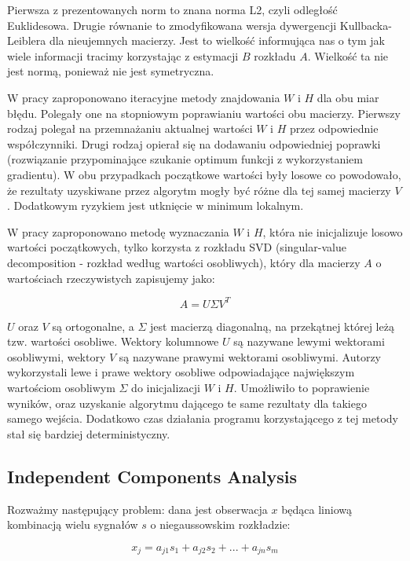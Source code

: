 \documentclass[oneside, eng]{mgr}
\begin{document}
Pierwsza z prezentowanych norm to znana norma L2, czyli odległość Euklidesowa. Drugie równanie to zmodyfikowana wersja dywergencji Kullbacka-Leiblera dla nieujemnych macierzy. Jest to wielkość informująca nas o tym jak wiele informacji tracimy korzystając z estymacji $B$ rozkładu $A$. Wielkość ta nie jest normą, ponieważ nie jest symetryczna.

W pracy \cite{NMF} zaproponowano iteracyjne metody znajdowania $W$ i $H$ dla obu miar błędu. Polegały one na stopniowym poprawianiu wartości obu macierzy. Pierwszy rodzaj polegał na przemnażaniu aktualnej wartości $W$ i $H$ przez odpowiednie współczynniki. Drugi rodzaj opierał się na dodawaniu odpowiedniej poprawki (rozwiązanie przypominające szukanie optimum funkcji z wykorzystaniem gradientu). W obu przypadkach początkowe wartości były losowe co powodowało, że rezultaty uzyskiwane przez algorytm mogły być różne dla tej samej macierzy $V$. Dodatkowym ryzykiem jest utknięcie w minimum lokalnym.

W pracy \cite{NMF_SVD} zaproponowano metodę wyznaczania $W$ i $H$, która nie inicjalizuje losowo wartości początkowych, tylko korzysta z rozkładu SVD (singular-value decomposition - rozkład według wartości osobliwych), który dla macierzy $A$ o wartościach rzeczywistych zapisujemy jako:

\begin{equation}
	A = U \Sigma V^T
\end{equation}

$U$ oraz $V$ są ortogonalne, a $\Sigma$ jest macierzą diagonalną, na przekątnej której leżą tzw. wartości osobliwe. Wektory kolumnowe $U$ są nazywane lewymi wektorami osobliwymi, wektory $V$ są nazywane prawymi wektorami osobliwymi. Autorzy \cite{NMF_SVD} wykorzystali lewe i prawe wektory osobliwe odpowiadające największym wartościom osobliwym $\Sigma$ do inicjalizacji $W$ i $H$. Umożliwiło to poprawienie wyników, oraz uzyskanie algorytmu dającego te same rezultaty dla takiego samego wejścia. Dodatkowo czas działania programu korzystającego z tej metody stał się bardziej deterministyczny.

\subsection{Independent Components Analysis}

Rozważmy następujący problem: dana jest obserwacja $x$ będąca liniową kombinacją wielu sygnałów $s$ o niegaussowskim rozkładzie:

\begin{equation}
	x_j = a_{j1} s_1 + a_{j2} s_2 + ... + a_{jn} s_m
\end{equation}
\end{document}
